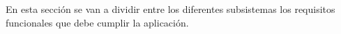 En esta sección se van a dividir entre los diferentes subsistemas los requisitos funcionales que debe cumplir la aplicación.